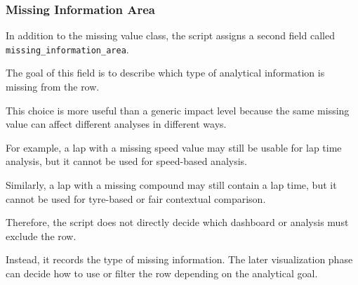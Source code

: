 \documentclass[a4paper,11pt]{article}
\begin{document}
	
	\subsubsection{Missing Information Area}
	
	In addition to the missing value class, the script assigns a second field called
	\texttt{missing\_information\_area}.
	
	The goal of this field is to describe which type of analytical information is missing from the row.
	
	This choice is more useful than a generic impact level because the same missing value can affect different analyses in different ways.
	
	For example, a lap with a missing speed value may still be usable for lap time analysis, but it cannot be used for speed-based analysis.
	
	Similarly, a lap with a missing compound may still contain a lap time, but it cannot be used for tyre-based or fair contextual comparison.
	
	Therefore, the script does not directly decide which dashboard or analysis must exclude the row.
	
	Instead, it records the type of missing information.
	The later visualization phase can decide how to use or filter the
	row depending on the analytical goal.
	
\end{document}
